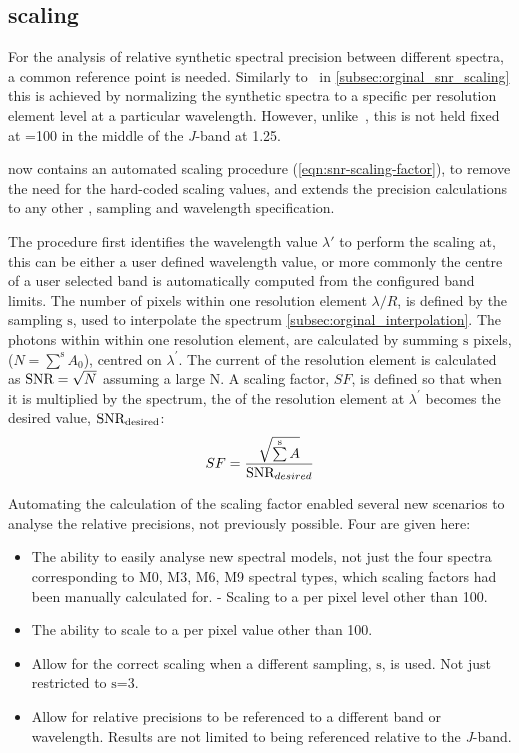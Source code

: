 \subsection{\snr{} scaling}
\label{subsec:snr_scaling}
For the analysis of relative synthetic spectral precision between different spectra, a common reference point is needed.
Similarly to~\citet{figueira_radial_2016} in \cref{subsec:orginal_snr_scaling} this is achieved by normalizing the synthetic spectra to a specific \snr{} per resolution element level at a particular wavelength.
However, unlike~\citet{figueira_radial_2016}, this is not held fixed at \snr{}=100 in the middle of the \emph{J}-band at 1.25\um{}.

\eniric{} now contains an automated \snr{} scaling procedure (\cref{eqn:snr-scaling-factor}), to remove the need for the hard-coded scaling values, and extends the precision calculations to any other \snr{}, sampling and wavelength specification.

The procedure first identifies the wavelength value \(\lambda\prime\) to perform the scaling at, this can be either a user defined wavelength value, or more commonly the centre of a user selected band is automatically computed from the configured band limits.
The number of pixels within one resolution element \(\lambda/R\), is defined by the sampling \(\mathrm{s}\), used to interpolate the spectrum \cref{subsec:orginal_interpolation}.
The photons within within one resolution element, are calculated by summing \(\mathrm{s}\) pixels, (\(N=\sum\limits^{\mathrm{s}}{{A}_{0}}\)), centred on \(\lambda^\prime\).
The current \snr{} of the resolution element is calculated as \(\textrm{SNR}{} = \sqrt{N}\) assuming a large N.
A scaling factor, \(SF\), is defined so that when it is multiplied by the spectrum, the \snr{} of the resolution element at \(\lambda^\prime\) becomes the desired value, \({\textrm{SNR}{}}_{\textrm{desired}}\):
\begin{equation}
SF =  \frac{\sqrt{\sum\limits^{\mathrm{s}} A}} {\textrm{SNR}{}_{desired}} \label{eqn:snr-scaling-factor}
\end{equation}

Automating the calculation of the scaling factor enabled several new scenarios to analyse the relative precisions, not previously possible.
Four are given here:
\begin{itemize}
    \setlength\itemsep{-0.3em} %
    \item The ability to easily analyse new spectral models, not just the four spectra corresponding to {M0}, {M3}, {M6}, {M9} spectral types, which scaling factors had been manually calculated for.
    - Scaling to a \snr{} per pixel level other than 100.
    \item The ability to scale to a \snr{} per pixel value other than 100.
    \item Allow for the correct scaling when a different sampling, \(\mathrm{s}\), is used.
    Not just restricted to \(\mathrm{s}\)=3.
    \item Allow for relative precisions to be referenced to a different band or wavelength.
    Results are not limited to being referenced relative to the \textit{J}-band.
\end{itemize}

